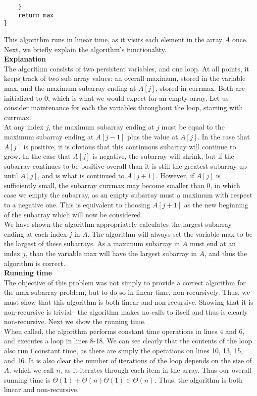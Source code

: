 \documentclass{article}
\begin{document}
\begin{enumerate}
\begin{lstlisting}
	}				
	return max
}
	\end{lstlisting}
	This algorithm runs in linear time, as it visits each element in the array $A$ once. Next, we briefly explain the algorithm's functionality.
	\\ \textbf{Explanation}
	\\The algorithm consists of two persistent variables, and one loop. At all points, it keeps track of two sub array values: an overall maximum, stored in the variable max, and the maximum subarray ending at $A[j]$, stored in currmax. Both are initialized to 0, which is what we would expect for an empty array. Let us consider maintenance for each the variables throughout the loop, starting with currmax.
	\\ At any index $j$, the maximum subarray ending at $j$ must be equal to the maximum subarray ending at $A[j-1]$ plus the value at $A[j]$. In the case that $A[j]$ is positive, it is obvious that this continuous subarray will continue to grow. In the case that $A[j]$ is negative, the subarray will shrink, but if the subarray continues to be positive overall than it is still the greatest subarray up until $A[j]$, and is what is continued to $A[j+1]$. However, if $A[j]$ is sufficiently small, the subarray currmax may become smaller than 0, in which case we empty the subarray, as an empty subarray must a maximum with respect to a negative one. This is equivalent to choosing $A[j+1]$ as the new beginning of the subarray which will now be considered.
	\\ We have shown the algorithm appropriately calculates the largest subarray ending at each index $j$ in $A$. The algorithm will always set the variable max to be the largest of these subarrays. As a maximum subarray in $A$ must end at an index $j$, than the variable max will have the largest subarray in $A$, and thus the algorithm is correct.
\\ \textbf{Running time}
\\ The objective of this problem was not simply to provide a correct algorithm for the max-subarray problem, but to do so in linear time, non-recursively. Thus, we must show that this algorithm is both linear and non-recursive. Showing that it is non-recursive is trivial-- the algorithm makes no calls to itself and thus is clearly non-recursive. Next we show the running time.
\\ When called, the algorithm performs constant time operations in lines 4 and 6, and executes a loop in lines 8-18. We can see clearly that the contents of the loop also run i constant time, as there are simply the operations on lines 10, 13, 15, and 16. It is also clear the number of iterations of the loop depends on the size of $A$, which we call $n$, as it iterates through each item in the array. Thus our overall running time is $\Theta(1)+\Theta(n)\Theta(1)\in \Theta(n)$. Thus, the algorithm is  both linear and non-recursive.

\end{enumerate}
\end{document}
